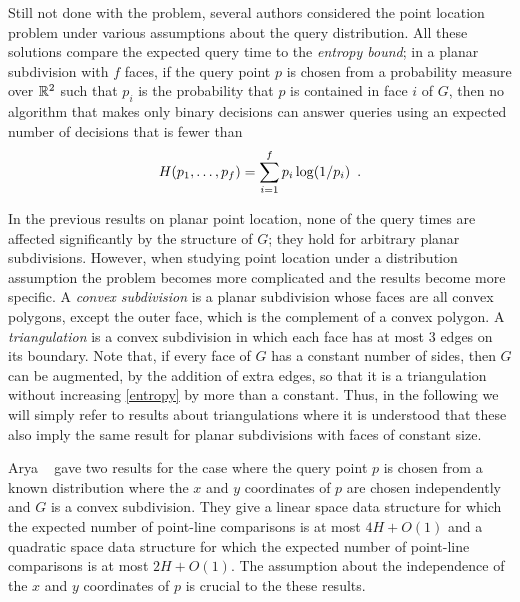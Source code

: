 \documentclass[charterfonts,lotsofwhite]{patmorin}
\begin{document}
Still not done with the problem, several authors considered the point
location problem under various assumptions about the query
distribution.  All these solutions compare the expected query time to
the \emph{entropy bound};  in a planar subdivision with $f$ faces, if the query
point $p$ is chosen from a probability measure over $\mathbb{R}^2$ such that
$p_i$ is the probability that $p$ is contained in face $i$ of $G$,
then no algorithm that makes only binary decisions can answer queries
using an expected number of decisions that is fewer than 
\begin{equation}
    H(p_1,\ldots,p_f) = \sum_{i=1}^f p_i\log(1/p_i) \enspace . 
	\eqlabel{entropy}
	\eqlabel{entropy-face}
\end{equation}

In the previous results on planar point location, none of the query
times are affected significantly by the structure of $G$;  they hold
for arbitrary planar subdivisions.  However, when studying point
location under a distribution assumption the problem becomes more
complicated and the results become more specific.  A \emph{convex
subdivision} is a planar subdivision whose faces are all convex
polygons, except the outer face, which is the complement of a convex
polygon.  A \emph{triangulation} is a convex subdivision in which each
face has at most 3 edges on its boundary.  Note that, if every face of
$G$ has a constant number of sides, then $G$ can be augmented, by the
addition of extra edges, so that it is a triangulation without
increasing \eqref{entropy} by more than a constant.  Thus, in the
following we will simply refer to results about triangulations where
it is understood that these also imply the same result for planar
subdivisions with faces of constant size.

Arya \etal\ \cite{acmr00} gave two results for the case where the
query point $p$ is chosen from a known distribution where the $x$ and
$y$ coordinates of $p$ are chosen independently and $G$ is a convex
subdivision.  They give a linear space data structure for which the
expected number of point-line comparisons is at most $4H+O(1)$ and a
quadratic space data structure for which the expected number of
point-line comparisons is at most $2H+O(1)$.  The assumption about the
independence of the $x$ and $y$ coordinates of $p$ is crucial to the
these results.
\end{document}
